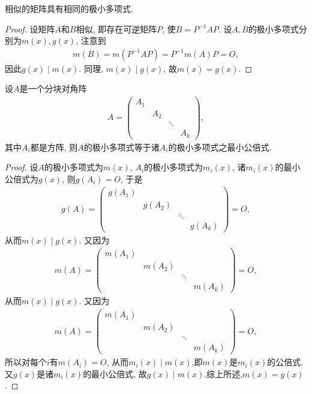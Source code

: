 \documentclass[lang=cn,newtx,10pt,scheme=chinese]{elegantbook}
\begin{document}
\begin{proposition}[相似的矩阵具有相同的极小多项式]\label{proposition:相似的矩阵具有相同的极小多项式}
相似的矩阵具有相同的极小多项式.
\end{proposition}
\begin{proof}
设矩阵$A$和$B$相似, 即存在可逆矩阵$P$, 使$B = P^{-1}AP$. 设$A, B$的极小多项式分别为$m(x), g(x)$, 注意到
\begin{align*}
m(B) = m(P^{-1}AP) = P^{-1}m(A)P = O,
\end{align*}
因此$g(x) \mid m(x)$. 同理, $m(x) \mid g(x)$, 故$m(x) = g(x)$.
\end{proof}

\begin{proposition}
设$A$是一个分块对角阵
\begin{align*}
A = \begin{pmatrix}
A_1 & & \\
& A_2 & \\
& & \ddots & \\
& & & A_k
\end{pmatrix},
\end{align*}
其中$A_i$都是方阵, 则$A$的极小多项式等于诸$A_i$的极小多项式之最小公倍式.
\end{proposition}
\begin{proof}
设$A$的极小多项式为$m(x)$, $A_i$的极小多项式为$m_i(x)$, 诸$m_i(x)$的最小公倍式为$g(x)$, 则$g(A_i) = O$, 于是
\begin{align*}
g(A) = \begin{pmatrix}
g(A_1) & & \\
& g(A_2) & \\
& & \ddots & \\
& & & g(A_k)
\end{pmatrix} = O,
\end{align*}
从而$m(x) \mid g(x)$. 又因为
\begin{align*}
m(A) = \begin{pmatrix}
m(A_1) & & \\
& m(A_2) & \\
& & \ddots & \\
& & & m(A_k)
\end{pmatrix} = O,
\end{align*}
从而$m(x) \mid g(x)$. 又因为
\begin{align*}
m(A) = \begin{pmatrix}
m(A_1) & & \\
& m(A_2) & \\
& & \ddots & \\
& & & m(A_k)
\end{pmatrix} = O,
\end{align*}
所以对每个$i$有$m(A_i) = O$, 从而$m_i(x) \mid m(x)$,即$m(x)$是$m_i(x)$的公倍式.又$g(x)$是诸$m_i(x)$的最小公倍式, 故$g(x) \mid m(x)$.综上所述,$m(x) = g(x)$.
\end{proof}
\end{document}
